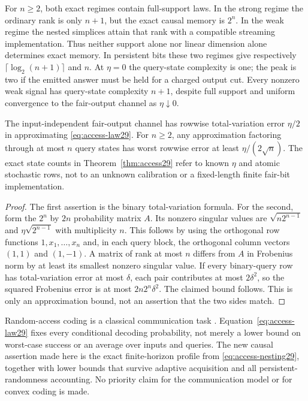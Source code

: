 For $n\ge2$, both exact regimes contain full-support laws. In the
strong regime the ordinary rank is only $n+1$, but the exact causal
memory is $2^n$. In the weak regime the nested simplices attain that
rank with a compatible streaming implementation. Thus neither support
alone nor linear dimension alone determines exact memory.
In persistent bits these two regimes give respectively
$\lceil\log_2(n+1)\rceil$ and $n$.
At $\eta=0$ the query-state complexity is one; the peak is two if the
emitted answer must be held for a charged output cut. Every nonzero
weak signal has query-state complexity $n+1$, despite full support
and uniform convergence to the fair-output channel as $\eta\downarrow0$.

\begin{proposition}
\label{prop:access-approx29}
The input-independent fair-output channel has rowwise total-variation
error $\eta/2$ in approximating \eqref{eq:access-law29}.
For $n\ge2$, any approximation factoring through at most $n$ query
states has worst rowwise error at least $\eta/(2\sqrt n)$.
The exact state counts in Theorem~\ref{thm:access29} refer to known
$\eta$ and atomic stochastic rows, not to an unknown calibration or
a fixed-length finite fair-bit implementation.
\end{proposition}
\begin{proof}
The first assertion is the binary total-variation formula. For the
second, form the $2^n$ by $2n$ probability matrix $A$. Its nonzero
singular values are $\sqrt{n2^{n-1}}$ and
$\eta\sqrt{2^{n-1}}$ with multiplicity $n$. This follows by using the
orthogonal row functions $1,x_1,\ldots,x_n$ and, in each query block,
the orthogonal column vectors $(1,1)$ and $(1,-1)$.
A matrix of rank at most $n$ differs from $A$ in Frobenius norm by at
least its smallest nonzero singular value. If every binary-query row
has total-variation error at most $\delta$, each pair contributes at
most $2\delta^2$, so the squared Frobenius error is at most
$2n2^n\delta^2$. The claimed bound follows. This is only an
approximation bound, not an assertion that the two sides match.
\end{proof}

Random-access coding is a classical communication task
\cite{ALMO,RAC2026,Liu2026}. Equation~\eqref{eq:access-law29}
fixes every conditional decoding probability, not merely a lower bound
on worst-case success or an average over inputs and queries. The new
causal assertion made here is the exact finite-horizon profile from
\eqref{eq:access-nesting29}, together with lower bounds that survive
adaptive acquisition and all persistent-randomness accounting. No
priority claim for the communication model or for convex coding is made.
